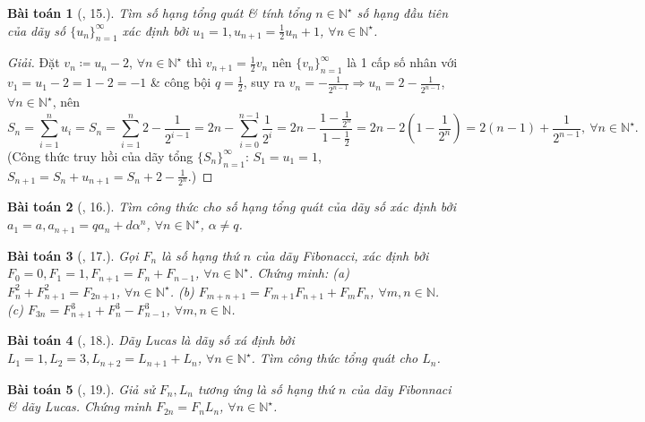 \documentclass[oneside]{book}
\newtheorem{baitoan}{Bài toán}
\begin{document}
\begin{baitoan}[\cite{TLCT_dai_so_giai_tich_11}, 15.]
	Tìm số hạng tổng quát \& tính tổng $n\in\mathbb{N}^\star$ số hạng đầu tiên của dãy số $\{u_n\}_{n=1}^\infty$ xác định bởi $u_1 = 1,u_{n+1} = \frac{1}{2}u_n + 1$, $\forall n\in\mathbb{N}^\star$.
\end{baitoan}

\begin{proof}[Giải]
	Đặt $v_n\coloneqq u_n - 2$, $\forall n\in\mathbb{N}^\star$ thì $v_{n+1} = \frac{1}{2}v_n$ nên $\{v_n\}_{n=1}^\infty$ là 1 cấp số nhân với $v_1 = u_1 - 2 = 1 - 2 = -1$ \& công bội $q = \frac{1}{2}$, suy ra $v_n = -\frac{1}{2^{n-1}}\Rightarrow u_n = 2 - \frac{1}{2^{n-1}}$, $\forall n\in\mathbb{N}^\star$, nên
	\begin{equation*}
		S_n = \sum_{i=1}^n u_i = S_n = \sum_{i=1}^n 2 - \frac{1}{2^{i-1}} = 2n - \sum_{i=0}^{n-1} \frac{1}{2^i} = 2n - \frac{1 - \frac{1}{2^n}}{1 - \frac{1}{2}} = 2n - 2\left(1 - \frac{1}{2^n}\right) = 2(n - 1) + \frac{1}{2^{n-1}},\ \forall n\in\mathbb{N}^\star.
	\end{equation*}
	(Công thức truy hồi của dãy tổng $\{S_n\}_{n=1}^\infty$: $S_1 = u_1 = 1$, $S_{n+1} = S_n + u_{n+1} = S_n + 2 - \frac{1}{2^n}$.)
\end{proof}

\begin{baitoan}[\cite{TLCT_dai_so_giai_tich_11}, 16.]
	Tìm công thức cho số hạng tổng quát của dãy số xác định bởi $a_1 = a,a_{n+1} = qa_n + d\alpha^n$, $\forall n\in\mathbb{N}^\star$, $\alpha\ne q$.
\end{baitoan}

\begin{baitoan}[\cite{TLCT_dai_so_giai_tich_11}, 17.]
	Gọi $F_n$ là số hạng thứ $n$ của dãy Fibonacci, xác định bởi $F_0 = 0,F_1 = 1,F_{n+1} = F_n + F_{n-1}$, $\forall n\in\mathbb{N}^\star$. Chứng minh: (a) $F_n^2 + F_{n+1}^2 = F_{2n+1}$, $\forall n\in\mathbb{N}^\star$. (b) $F_{m+n+1} = F_{m+1}F_{n+1} + F_mF_n$, $\forall m,n\in\mathbb{N}$. (c) $F_{3n} = F_{n+1}^3 + F_n^3 - F_{n-1}^3$, $\forall m,n\in\mathbb{N}$.
\end{baitoan}

\begin{baitoan}[\cite{TLCT_dai_so_giai_tich_11}, 18.]
	Dãy Lucas là dãy số xá định bởi $L_1 = 1,L_2 = 3,L_{n+2} = L_{n+1} + L_n$, $\forall n\in\mathbb{N}^\star$. Tìm công thức tổng quát cho $L_n$.
\end{baitoan}

\begin{baitoan}[\cite{TLCT_dai_so_giai_tich_11}, 19.]
	Giả sử $F_n,L_n$ tương ứng là số hạng thứ $n$ của dãy Fibonnaci \& dãy Lucas. Chứng minh $F_{2n} = F_nL_n$, $\forall n\in\mathbb{N}^\star$.
\end{baitoan}
\end{document}
